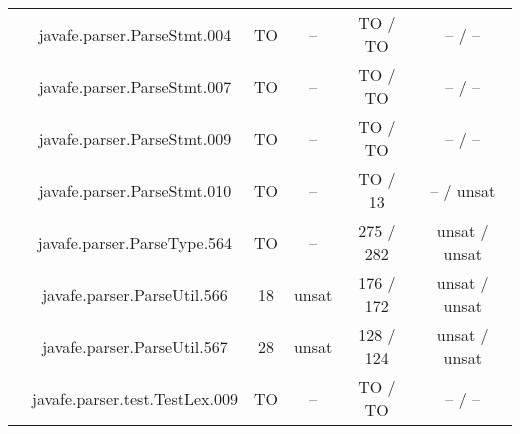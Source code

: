 \begin{table}[htbp]
\begin{minipage}{0.60\textwidth}
{\begin{tabular}[c]{c c!{\vrule width 1.5pt}c|c!{\vrule width 1.5pt}c|c|}
		 	& javafe.parser.ParseStmt.004	    			     & TO   & --      & TO  / TO       & --    / --        \\
		 	& javafe.parser.ParseStmt.007	    			     & TO   & --      & TO  / TO       & --    / --        \\
 			& javafe.parser.ParseStmt.009		   		     & TO   & --      & TO  / TO       & --    / --        \\
 			& javafe.parser.ParseStmt.010		   		     & TO   & --      & TO  / 13       & --    / unsat     \\
 			& javafe.parser.ParseType.564		   		     & TO   & --      & 275 / 282      & unsat / unsat     \\
 			& javafe.parser.ParseUtil.566		   		     & 18   & unsat   & 176 / 172      & unsat / unsat     \\
 			& javafe.parser.ParseUtil.567		   		     & 28   & unsat   & 128 / 124      & unsat / unsat     \\
 			& javafe.parser.test.TestLex.009	   		     & TO   & --      & TO  / TO       & --    / --        \\

\end{tabular}}
\end{minipage}
\end{table}
